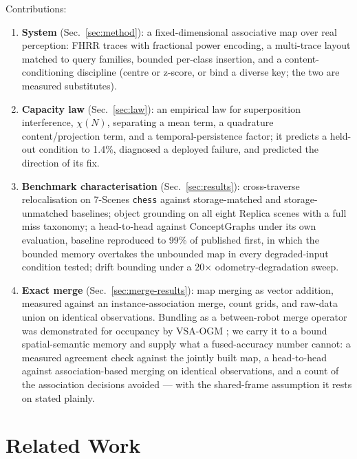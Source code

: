 \documentclass[conference]{IEEEtran}
\begin{document}
Contributions:
\begin{enumerate}
\item \textbf{System} (Sec.~\ref{sec:method}): a fixed-dimensional
  associative map over real perception: FHRR traces with fractional
  power encoding, a multi-trace layout matched to query families, bounded
  per-class insertion, and a content-conditioning discipline (centre or
  z-score, or bind a diverse key; the two are measured substitutes).
\item \textbf{Capacity law} (Sec.~\ref{sec:law}): an empirical law for
  superposition interference, $\chi(N)$, separating a mean term, a
  quadrature content/projection term, and a temporal-persistence factor;
  it predicts a held-out condition to 1.4\%, diagnosed a deployed
  failure, and predicted the direction of its fix.
\item \textbf{Benchmark characterisation} (Sec.~\ref{sec:results}):
  cross-traverse relocalisation on 7-Scenes \texttt{chess} against
  storage-matched and storage-unmatched baselines; object grounding on
  all eight Replica scenes with a full miss taxonomy; a head-to-head
  against ConceptGraphs under its own evaluation, baseline reproduced
  to 99\% of published first, in which the bounded memory overtakes the
  unbounded map in every degraded-input condition tested; drift bounding
  under a 20$\times$ odometry-degradation sweep.
\item \textbf{Exact merge} (Sec.~\ref{sec:merge-results}): map merging as
  vector addition, measured against an instance-association merge, count
  grids, and raw-data union on identical observations. Bundling as a
  between-robot merge operator was demonstrated for occupancy by VSA-OGM
  \cite{snyder2026vsaogm}; we carry it to a bound spatial-semantic memory
  and supply what a fused-accuracy number cannot: a measured agreement
  check against the jointly built map, a head-to-head against
  association-based merging on identical observations, and a count of the
  association decisions avoided --- with the shared-frame assumption it
  rests on stated plainly.
\end{enumerate}

\section{Related Work}
\label{sec:related}
\end{document}
